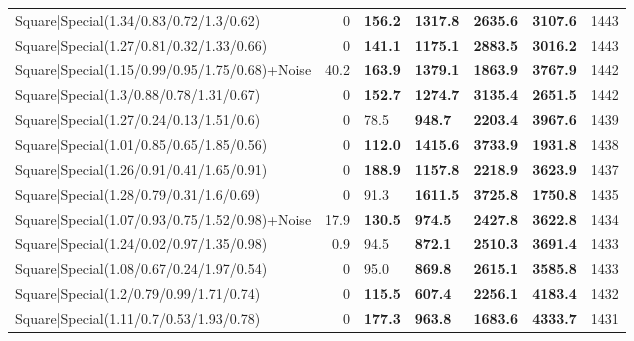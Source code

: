 \begin{tabular}{lrllllr}
 Square|Special(1.34/0.83/0.72/1.3/0.62)                       &             0   & \textbf{156.2} & \textbf{1317.8} & \textbf{2635.6} & \textbf{3107.6} &         1443 \\
 Square|Special(1.27/0.81/0.32/1.33/0.66)                      &             0   & \textbf{141.1} & \textbf{1175.1} & \textbf{2883.5} & \textbf{3016.2} &         1443 \\
 Square|Special(1.15/0.99/0.95/1.75/0.68)+Noise                &            40.2 & \textbf{163.9} & \textbf{1379.1} & \textbf{1863.9} & \textbf{3767.9} &         1442 \\
 Square|Special(1.3/0.88/0.78/1.31/0.67)                       &             0   & \textbf{152.7} & \textbf{1274.7} & \textbf{3135.4} & \textbf{2651.5} &         1442 \\
 Square|Special(1.27/0.24/0.13/1.51/0.6)                       &             0   & 78.5           & \textbf{948.7}  & \textbf{2203.4} & \textbf{3967.6} &         1439 \\
 Square|Special(1.01/0.85/0.65/1.85/0.56)                      &             0   & \textbf{112.0} & \textbf{1415.6} & \textbf{3733.9} & \textbf{1931.8} &         1438 \\
 Square|Special(1.26/0.91/0.41/1.65/0.91)                      &             0   & \textbf{188.9} & \textbf{1157.8} & \textbf{2218.9} & \textbf{3623.9} &         1437 \\
 Square|Special(1.28/0.79/0.31/1.6/0.69)                       &             0   & 91.3           & \textbf{1611.5} & \textbf{3725.8} & \textbf{1750.8} &         1435 \\
 Square|Special(1.07/0.93/0.75/1.52/0.98)+Noise                &            17.9 & \textbf{130.5} & \textbf{974.5}  & \textbf{2427.8} & \textbf{3622.8} &         1434 \\
 Square|Special(1.24/0.02/0.97/1.35/0.98)                      &             0.9 & 94.5           & \textbf{872.1}  & \textbf{2510.3} & \textbf{3691.4} &         1433 \\
 Square|Special(1.08/0.67/0.24/1.97/0.54)                      &             0   & 95.0           & \textbf{869.8}  & \textbf{2615.1} & \textbf{3585.8} &         1433 \\
 Square|Special(1.2/0.79/0.99/1.71/0.74)                       &             0   & \textbf{115.5} & \textbf{607.4}  & \textbf{2256.1} & \textbf{4183.4} &         1432 \\
 Square|Special(1.11/0.7/0.53/1.93/0.78)                       &             0   & \textbf{177.3} & \textbf{963.8}  & \textbf{1683.6} & \textbf{4333.7} &         1431 \\

\end{tabular}
